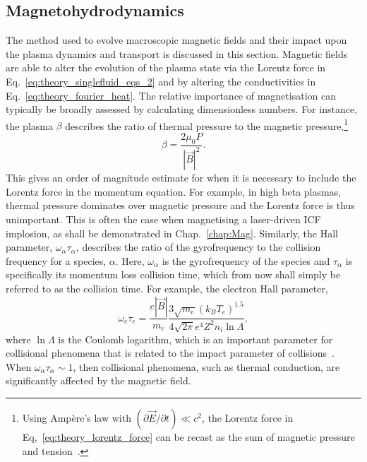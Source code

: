 \subsection{Magnetohydrodynamics}%
\label{sec:theory_MHD}

The method used to evolve macroscopic magnetic fields and their impact upon the plasma dynamics and transport is discussed in this section.
Magnetic fields are able to alter the evolution of the plasma state via the Lorentz force in Eq.~\ref{eq:theory_singlefluid_eqs_2} and by altering the conductivities in Eq.~\ref{eq:theory_fourier_heat}.
The relative importance of magnetisation can typically be broadly assessed by calculating dimensionless numbers.
For instance, the plasma $\beta$ describes the ratio of thermal pressure to the magnetic pressure,\footnote{Using Amp\`ere's law with $(\partial \vec{E} / \partial t) \ll c^2$, the Lorentz force in Eq,~\ref{eq:theory_lorentz_force} can be recast as the sum of magnetic pressure and tension~\cite{oneill_modelling_2023}.}
\begin{equation}
    \beta = \frac{2 \mu_0 P}{|\vec{B}|^2}.
\end{equation}
This gives an order of magnitude estimate for when it is necessary to include the Lorentz force in the momentum equation.
For example, in high beta plasmas, thermal pressure dominates over magnetic pressure and the Lorentz force is thus unimportant.
This is often the case when magnetising a laser-driven \ac{ICF} implosion, as shall be demonstrated in Chap.~\ref{chap:Mag}.
Similarly, the Hall parameter, $\omega_\alpha \tau_\alpha$, describes the ratio of the gyrofrequency to the collision frequency for a species, $\alpha$.
Here, $\omega_\alpha$ is the gyrofrequency of the species and $\tau_\alpha$ is specifically its momentum loss collision time, which from now shall simply be referred to as the collision time.
For example, the electron Hall parameter,
\begin{equation}
    \omega_e \tau_e = \frac{e |\vec{B}|}{m_e} \frac{3\sqrt{m_e} (k_B T_e)^{1.5}}{4 \sqrt{2\pi} e^4 Z^2 n_i \ln \Lambda },
\end{equation}
where $\ln\Lambda$ is the Coulomb logarithm, which is an important parameter for collisional phenomena that is related to the impact parameter of collisions~\cite{ramazanov_coulomb_2001,kodanova_investigation_2015,lin_temperature_2023}.
When $\omega_\alpha \tau_\alpha \sim 1$, then collisional phenomena, such as thermal conduction, are significantly affected by the magnetic field.

